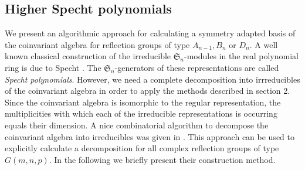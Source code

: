 \documentclass[11pt,a4paper]{amsart}
\numberwithin{equation}{section}
\theoremstyle{definition}
\numberwithin{thm}{section}
\theoremstyle{break}
\numberwithin{subcase}{case}
\begin{document}
\subsection{Higher Specht polynomials}

We present an algorithmic approach for calculating a symmetry adapted basis of the coinvariant algebra for reflection groups of type $A_{n-1},B_n$ or $D_n$.
A well known classical construction of the irreducible $\mathfrak{S}_n$-modules in the real polynomial ring is due to Specht \cite{specht}. The $\mathfrak{S}_n$-generators of these representations are called \emph{Specht polynomials}.  However, we need a complete decomposition into irrreducibles of the coinvariant algebra in order to apply the methods described in section 2. Since the coinvariant algebra is isomorphic to the regular representation, the multiplicities with which each of the irreducible representations is occurring equals their dimension. A nice combinatorial algorithm to decompose the coinvariant algebra into irreducibles was given in \cite{morita1998higher}. This approach  can be used to explicitly calculate a decomposition for all complex reflection groups of type $G(m,n,p)$. In the following we briefly present their construction method. 
\end{document}

